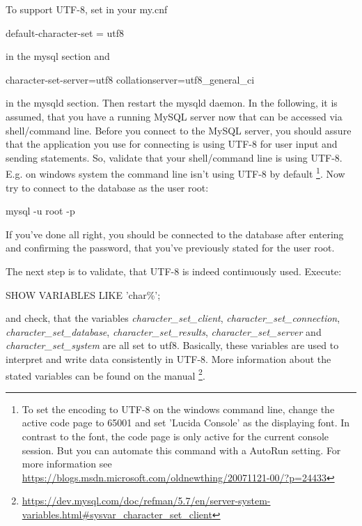 To support UTF-8, set in your my.cnf 

\begin{codebox}
	default-character-set = utf8
\end{codebox}

in the mysql section and

\begin{codebox}
	character-set-server=utf8\newline
	collation\-server=utf8\_general\_ci
\end{codebox}

in the mysqld section. Then restart the mysqld daemon. In the following, it is assumed, that you have a running MySQL server now that can be accessed via shell/command line. Before you connect to the MySQL server, you should assure that the application you use for connecting is using UTF-8 for user input and sending statements. So, validate that your shell/command line is using UTF-8. E.g. on windows system the command line isn't using UTF-8 by default
\footnote{To set the encoding to UTF-8 on the windows command line, change the active code page to 65001 and set 'Lucida Console' as the displaying font. In contrast to the font, the code page is only active for the current console session. But you can automate this command with a AutoRun setting. For more information see \url{https://blogs.msdn.microsoft.com/oldnewthing/20071121-00/?p=24433}}.  
Now try to connect to the database as the user root:

\begin{codebox}
	mysql -u root -p 
\end{codebox}

If you've done all right, you should be connected to the database after entering and confirming the password, that you've previously stated for the user root.

The next step is to validate, that UTF-8 is indeed continuously used. Execute:

\begin{codebox}
	SHOW VARIABLES LIKE 'char\%';
\end{codebox}

and check, that the variables \emph{character\_set\_client}, \emph{character\_set\_connection}, \emph{character\_set\_database}, \emph{character\_set\_results}, \emph{character\_set\_server} and \emph{character\_set\_system} are all set to utf8.
Basically, these variables are used to interpret and write data consistently in UTF-8. More information about the stated variables can be found on the manual
\footnote{\url{https://dev.mysql.com/doc/refman/5.7/en/server-system-variables.html\#sysvar_character_set_client}}.

